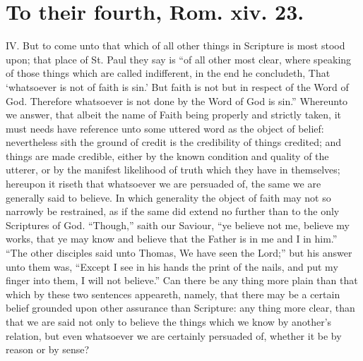 \section*{To their fourth, Rom. xiv. 23.}

IV. But to come unto that which of all other things in Scripture is most stood upon; that place of St. Paul they say is “of all other most clear, where speaking of those things which are called indifferent, in the end he concludeth, That ‘whatsoever is not of faith is sin.’ But faith is not but in respect of the Word of God. Therefore whatsoever is not done by the Word of God is sin.” Whereunto we answer, that albeit the name of Faith being properly and strictly taken, it must needs have reference unto some uttered word as the object of belief: nevertheless sith the ground of credit is the credibility of things credited; and things are made credible, either by the known condition and quality of  the utterer, or by the manifest likelihood of truth which they have in themselves; hereupon it riseth that whatsoever we are persuaded of, the same we are generally said to believe. In which generality the object of faith may not so narrowly be restrained, as if the same did extend no further than to the only Scriptures of God. “Though,” saith our Saviour, “ye believe not me, believe my works, that ye may know and believe that the Father is in me and I in him.” “The other disciples said unto Thomas, We have seen the Lord;” but his answer unto them was, “Except I see in his hands the print of the nails, and put my finger into them, I will not believe.” Can there be any thing more plain than that which by these two sentences appeareth, namely, that there may be a certain belief grounded upon other assurance than Scripture: any thing more clear, than that we are said not only to believe the things which we know by another’s relation, but even whatsoever we are certainly persuaded of, whether it be by reason or by sense?

